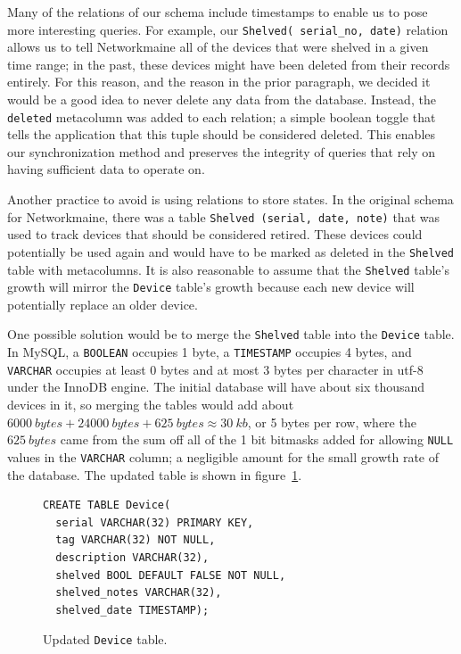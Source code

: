 \documentclass[journal]{IEEEtran}
\begin{document}
Many of the relations of our schema include timestamps to enable us to pose more interesting queries. For example, our \texttt{Shelved( serial\_no, date)} relation allows us to tell Networkmaine all of the devices that were shelved in a given time range; in the past, these devices might have been deleted from their records entirely. For this reason, and the reason in the prior paragraph, we decided it would be a good idea to never delete any data from the database. Instead, the \texttt{deleted} metacolumn was added to each relation; a simple boolean toggle that tells the application that this tuple should be considered deleted. This enables our synchronization method and preserves the integrity of queries that rely on having sufficient data to operate on.

Another practice to avoid is using relations to store states. In the original schema for Networkmaine, there was a table \hbox{\texttt{Shelved (serial, date, note)}} that was used to track devices that should be considered retired. These devices could potentially be used again and would have to be marked as deleted in the \texttt{Shelved} table with metacolumns. It is also reasonable to assume that the \texttt{Shelved} table's growth will mirror the \texttt{Device} table's growth because each new device will potentially replace an older device. 

One possible solution would be to merge the \texttt{Shelved} table into the \texttt{Device} table. In MySQL, a \texttt{BOOLEAN} occupies 1 byte, a \texttt{TIMESTAMP} occupies 4 bytes, and \texttt{VARCHAR} occupies at least 0 bytes and at most 3 bytes per character in utf-8 under the InnoDB engine. The initial database will have about six thousand devices in it, so merging the tables would add about $6000~bytes + 24000~bytes + 625~bytes \approx 30~kb$, or 5 bytes per row, where the $625~bytes$ came from the sum off all of the 1 bit bitmasks added for allowing \texttt{NULL} values in the \texttt{VARCHAR} column; a negligible amount for the small growth rate of the database. The updated table is shown in figure~\ref{fig:updated_device}.

 
\begin{figure}[h!]
\begin{lstlisting}
CREATE TABLE Device(
  serial VARCHAR(32) PRIMARY KEY,
  tag VARCHAR(32) NOT NULL,
  description VARCHAR(32),
  shelved BOOL DEFAULT FALSE NOT NULL,
  shelved_notes VARCHAR(32),
  shelved_date TIMESTAMP);
\end{lstlisting}
\caption{Updated \texttt{Device} table.}
\label{fig:updated_device}
\end{figure}
\end{document}
